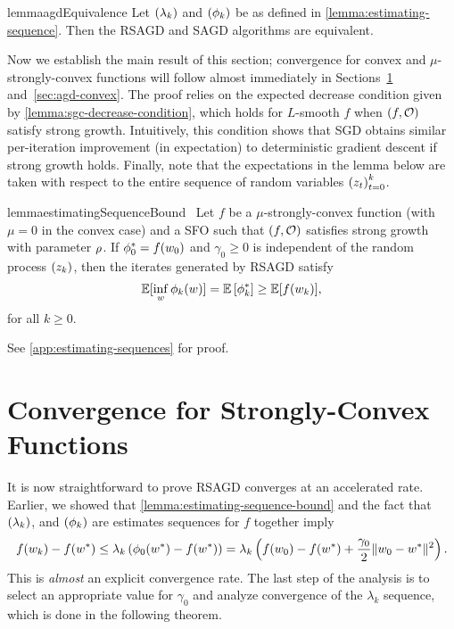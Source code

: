 \begin{restatable}{lemma}{agdEquivalence}\label{lemma:agdEquivalence}
    Let \( \seq{\lambda_k} \) and \( \seq{\phi_k} \) be as defined in \autoref{lemma:estimating-sequence}.
    Then the \ac{RSAGD} and \ac{SAGD} algorithms are equivalent.
\end{restatable}

Now we establish the main result of this section; convergence for convex and \( \mu \)-strongly-convex functions will follow almost immediately in Sections~\ref{sec:agd-sc} and~\ref{sec:agd-convex}.
The proof relies on the expected decrease condition given by \autoref{lemma:sgc-decrease-condition}, which holds for \( L \)-smooth \( f \) when \( \rbr{f, \oracle{}} \) satisfy strong growth.
Intuitively, this condition shows that \ac{SGD} obtains similar per-iteration improvement (in expectation) to deterministic gradient descent if strong growth holds. 
Finally, note that the expectations in the lemma below are taken with respect to the entire sequence of random variables \( \seq{\z_t}_{t=0}^k \).

\begin{restatable}{lemma}{estimatingSequenceBound}~\label{lemma:estimating-sequence-bound}
    Let \( f \) be a \( \mu \)-strongly-convex function (with \( \mu = 0 \) in the convex case) and \oracle{} a \ac{SFO} such that \( \rbr{f, \oracle{}} \) satisfies strong growth with parameter \( \sgc \).
    If \( \phi_0^* = f(\w_0) \) and \( \gamma_0 \geq 0 \) is independent of the random process \( \seq{\zk} \), then the iterates generated by \ac{RSAGD} satisfy 
    \[ \E [\inf_{w} \phi_k(\w)] = \E \sbr{\phi_k^*} \geq \E [f(\wk)], \]
    for all \( k \geq 0 \).
\end{restatable}
\noindent See \autoref{app:estimating-sequences} for proof.

\section{Convergence for Strongly-Convex Functions}\label{sec:agd-sc}

It is now straightforward to prove \ac{RSAGD} converges at an accelerated rate. 
Earlier, we showed that \autoref{lemma:estimating-sequence-bound} and the fact that \( \seq{\lambda_k} \), and \( \seq{\phi_k} \) are estimates sequences for \( f \) together imply
\[ f(\wk) - f(\wopt) \leq \lambda_k \rbr{\phi_0(\wopt) - f(\wopt)} = \lambda_k \rbr{f(\w_0) - f(\wopt) + \frac{\gamma_0}{2} \norm{\w_0 - \wopt}^2}. \]
This is \emph{almost} an explicit convergence rate. 
The last step of the analysis is to select an appropriate value for \( \gamma_0 \) and analyze convergence of the \( \lambda_k \) sequence, which is done in the following theorem.

